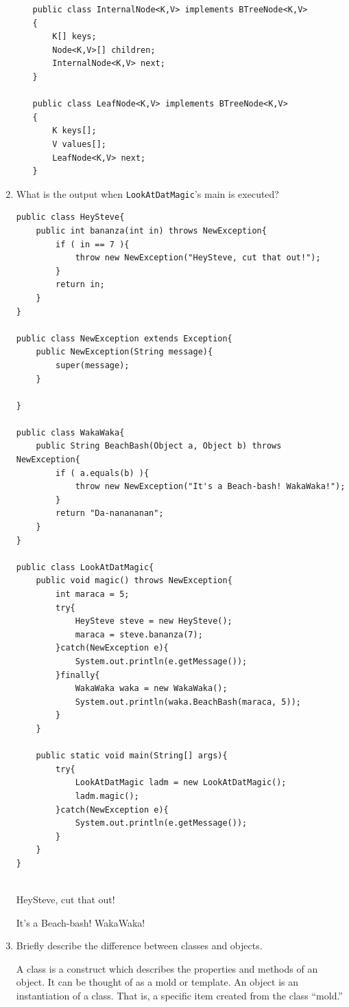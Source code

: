 \documentclass[11pt]{article}
\newenvironment{answer}{\large\lstset{basicstyle=\tiny\ttfamily}\color{white}}{}
\newenvironment{answer}{\large\lstset{basicstyle=\large\ttfamily}\color{red}}{}
\begin{document}
\begin{enumerate}
\begin{enumerate}
\begin{answer}
\begin{lstlisting}
public class InternalNode<K,V> implements BTreeNode<K,V>
{
    K[] keys;
    Node<K,V>[] children;
    InternalNode<K,V> next;
}

public class LeafNode<K,V> implements BTreeNode<K,V>
{
    K keys[];
    V values[];
    LeafNode<K,V> next;
}
\end{lstlisting}
\end{answer}

    \end{enumerate}


\newpage
\item What is the output when \texttt{LookAtDatMagic}'s main is executed?
\begin{lstlisting}
public class HeySteve{
    public int bananza(int in) throws NewException{
        if ( in == 7 ){
            throw new NewException("HeySteve, cut that out!");
        }
        return in;
    }
}

public class NewException extends Exception{
    public NewException(String message){
        super(message);
    }

}
           
public class WakaWaka{
    public String BeachBash(Object a, Object b) throws NewException{
        if ( a.equals(b) ){
            throw new NewException("It's a Beach-bash! WakaWaka!");
        }
        return "Da-nanananan";
    }
}

public class LookAtDatMagic{
    public void magic() throws NewException{
        int maraca = 5;
        try{
            HeySteve steve = new HeySteve();
            maraca = steve.bananza(7);
        }catch(NewException e){
            System.out.println(e.getMessage());
        }finally{
            WakaWaka waka = new WakaWaka();
            System.out.println(waka.BeachBash(maraca, 5));
        }
    }

    public static void main(String[] args){
        try{
            LookAtDatMagic ladm = new LookAtDatMagic();
            ladm.magic();
        }catch(NewException e){
            System.out.println(e.getMessage());
        }
    }
}


\end{lstlisting}
\begin{answer}
HeySteve, cut that out!


It's a Beach-bash! WakaWaka!
\end{answer}
\pagebreak
\item Briefly describe the difference between classes and objects.

    \begin{answer}
    A class is a construct which describes the properties and methods of an
    object. It can be thought of as a mold or template. An object is an 
    instantiation of a class. That is, a specific item created from the class
    ``mold.''
    \end{answer}


\end{enumerate}
\end{document}
